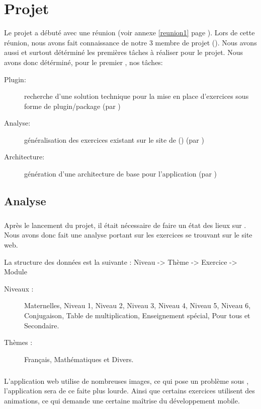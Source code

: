 \documentclass[french]{report}
\begin{document}
\chapter{Projet}
Le projet a débuté avec une réunion (voir annexe \ref{reunion1} page \pageref{reunion1}). Lors de cette réunion, nous avons fait connaissance de notre 3\ieme{} membre de projet (\etudiantSL{}). Nous avons aussi et surtout détérminé les premières t\^{a}ches à réaliser pour le projet.
Nous avons donc détérminé, pour le premier \sprint{}, nos t\^aches:
\begin{description}
	\item[Plugin:] recherche d'une solution technique pour la mise en place d'exercices sous forme de plugin/package (par \etudiantSL{})
	\item[Analyse:] \og{}généralisation\fg{} des exercices existant sur le site de \pepit{} (\pepitSite{}) (par \etudiantRD{})
	\item[Architecture:] génération d'une architecture de base pour l'application (par \etudiantJP{})
\end{description}
\section{Analyse}
\paragraph{}Après le lancement du projet, il était nécessaire de faire un état des lieux sur \pepitSite{}. Nous avons donc fait une analyse portant sur les exercices se trouvant sur le site web.

La structure des données est la suivante : Niveau -> Thème -> Exercice -> Module

\begin{description}
\item[Niveaux : ] Maternelles, Niveau 1, Niveau 2, Niveau 3, Niveau 4, Niveau 5, Niveau 6, Conjugaison, Table de multiplication, Enseignement spécial, Pour tous et Secondaire.
\item[Thèmes : ] Français, Mathématiques et Divers.
\end{description}

\paragraph{}L'application web utilise de nombreuses images, ce qui pose un problème sous \android, l'application sera de ce faite plus lourde. Ainsi que certains exercices utilisent des animations, ce qui demande une certaine ma\^{i}trise du développement mobile.
\end{document}
